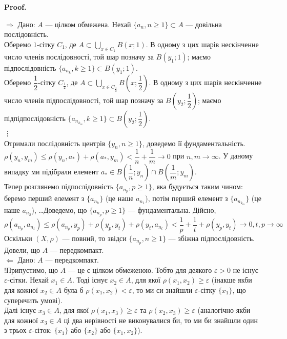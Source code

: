 \documentclass[a4paper, 10pt]{article}
\makeatletter
\def\rightproof{$\boxed{\Rightarrow}$ }
\def\leftproof{$\boxed{\Leftarrow}$ }
\theoremstyle{theoremdd}
\theoremstyle{theoremdd}
\theoremstyle{theoremdd}
\theoremstyle{theoremdd}
\theoremstyle{theoremdd}
\theoremstyle{theoremdd}
\theoremstyle{theoremdd}
\theoremstyle{theoremdd}
\renewenvironment{proof}[1][Proof.\\]{\par
\pushQED{\hfill \qed}%
\normalfont \topsep6\p@\@plus6\p@\relax
\trivlist
\item\relax
{\bfseries
#1\@addpunct{.}}\hspace\labelsep\ignorespaces
}{%
\popQED\endtrivlist\@endpefalse
}
\makeatother
\begin{document}
\begin{proof}
\rightproof Дано: $A$ --- цілком обмежена. Нехай $\{a_n, n \geq 1\} \subset A$ --- довільна послідовність. \\
Оберемо $1$-сітку $C_1$, де $A \subset \displaystyle\bigcup_{x \in C_1} B(x;1)$. В одному з цих шарів нескінченне число членів послідовності, той шар позначу за $B(y_1;1)$; маємо підпослідовність $\{a_{n_k}, k \geq 1\} \subset B(y_1;1)$.\\
Оберемо $\dfrac{1}{2}$-сітку $C_{\frac{1}{2}}$, де $A \subset \displaystyle\bigcup_{x \in C_{\frac{1}{2}}} B\left(x;\dfrac{1}{2}\right)$. В одному з цих шарів нескінченне число членів підпослідовності, той шар позначу за $B\left(y_2;\dfrac{1}{2}\right)$; маємо підпідпослідовність $\{a_{n_{k_m}}, k \geq 1\} \subset B\left(y_2;\dfrac{1}{2}\right)$.\\
\vdots \\
Отримали послідовність центрів $\{y_n, n \geq 1\}$, доведемо її фундаментальність.\\
$\rho(y_n,y_m) \leq \rho(y_n,a_*) + \rho(a_*,y_m) < \dfrac{1}{n} + \dfrac{1}{m} \to 0$ при $n,m \to \infty$. У даному випадку ми підібрали елемент $a_* \in B\left( \dfrac{1}{n};y_n \right) \cap B\left( \dfrac{1}{m};y_m \right)$.\\
Тепер розглянемо підпослідовність $\{a_{n_p}, p \geq 1\}$, яка будується таким чином: беремо перший елемент з $\{a_{n_k}\}$ (це наше $a_{n_1}$), потім перший елемент з $\{a_{n_{k_m}}\}$ (це наше $a_{n_2}$), \dots Доведемо, що $\{a_{n_p}, p \geq 1\}$ --- фундаментальна. Дійсно,\\
$\rho(a_{n_p}, a_{n_t}) \leq \rho(a_{n_p}, y_p) + \rho(y_p,y_t) + \rho(y_t,a_{n_t}) < \dfrac{1}{p} + \dfrac{1}{t} + \rho(y_p,y_t) \to 0, t,p \to \infty$\\
Оскільки $(X,\rho)$ --- повний, то звідси $\{a_{n_p}, n \geq 1\}$ --- збіжна підпослідовність. Довели, що $A$ --- передкомпакт.
\bigskip \\
\leftproof Дано: $A$ --- передкомпакт.\\
!Припустимо, що $A$ --- це є цілком обмеженою. Тобто для деякого $\varepsilon > 0$ не існує $\varepsilon$-сітки. Нехай $x_1 \in A$. Тоді існує $x_2 \in A$, для якої $\rho(x_1,x_2) \geq \varepsilon$ (інакше якби для кожної $x_2 \in A$ була б $\rho(x_1,x_2) < \varepsilon$, то ми си знайшли $\varepsilon$-сітку $\{x_1\}$, що суперечить умові).\\
Далі існує $x_3 \in A$, для якої $\rho(x_1,x_3) \geq \varepsilon$ та $\rho(x_2,x_3) \geq \varepsilon$ (аналогічно якби для кожної $x_3 \in A$ ці два нерівності не виконувалися би, то ми би знайшли один з трьох $\varepsilon$-сіток: $\{x_1\}$ або $\{x_2\}$ або $\{x_1,x_2\}$).\\

\end{proof}
\end{document}
